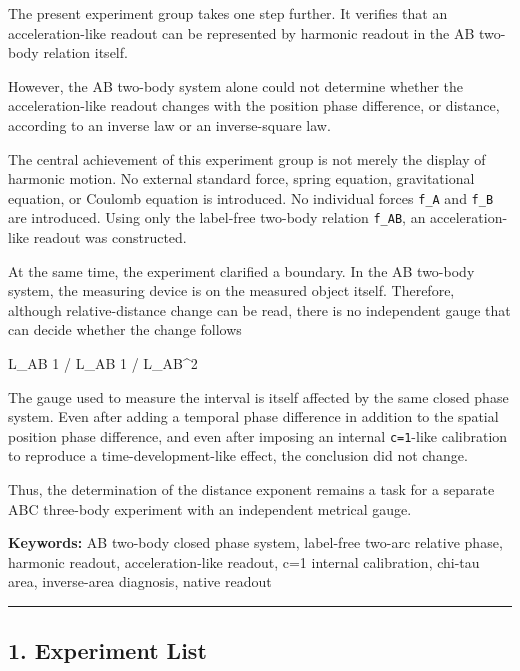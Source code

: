 \documentclass[
]{article}
\newenvironment{Shaded}{}{}
\newcommand{\NormalTok}[1]{#1}
\begin{document}
The present experiment group takes one step further. It verifies that an
acceleration-like readout can be represented by harmonic readout in the
AB two-body relation itself.

However, the AB two-body system alone could not determine whether the
acceleration-like readout changes with the position phase difference, or
distance, according to an inverse law or an inverse-square law.

The central achievement of this experiment group is not merely the
display of harmonic motion. No external standard force, spring equation,
gravitational equation, or Coulomb equation is introduced. No individual
forces \texttt{f\_A} and \texttt{f\_B} are introduced. Using only the
label-free two-body relation \texttt{f\_AB}, an acceleration-like
readout was constructed.

At the same time, the experiment clarified a boundary. In the AB
two-body system, the measuring device is on the measured object itself.
Therefore, although relative-distance change can be read, there is no
independent gauge that can decide whether the change follows

\begin{Shaded}
\begin{Highlighting}[]
\NormalTok{L\_AB}
\NormalTok{1 / L\_AB}
\NormalTok{1 / L\_AB\^{}2}
\end{Highlighting}
\end{Shaded}

The gauge used to measure the interval is itself affected by the same
closed phase system. Even after adding a temporal phase difference in
addition to the spatial position phase difference, and even after
imposing an internal \texttt{c=1}-like calibration to reproduce a
time-development-like effect, the conclusion did not change.

Thus, the determination of the distance exponent remains a task for a
separate ABC three-body experiment with an independent metrical gauge.

\textbf{Keywords:} AB two-body closed phase system, label-free two-arc
relative phase, harmonic readout, acceleration-like readout, c=1
internal calibration, chi-tau area, inverse-area diagnosis, native
readout

\begin{center}\rule{0.5\linewidth}{0.5pt}\end{center}

\subsection{1. Experiment List}\label{experiment-list}
\end{document}
